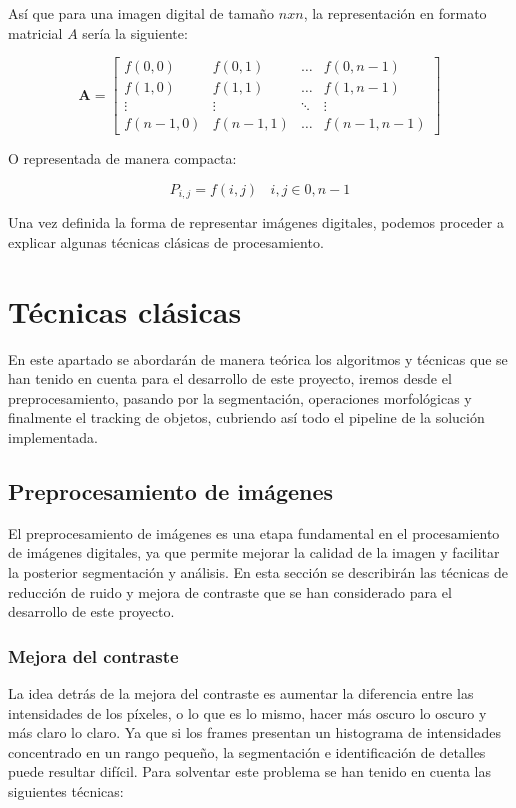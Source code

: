 Así que para una imagen digital de tamaño $n x n$, la representación en formato matricial $A$ sería la siguiente:

\begin{equation} \label{eq:matriz}
\mathbf{A} = 
\begin{bmatrix}
f(0,0) & f(0,1) & \dots & f(0,n-1) \\
f(1,0) & f(1,1) & \dots & f(1,n-1) \\
\vdots & \vdots & \ddots & \vdots \\
f(n-1,0) & f(n-1,1) & \dots & f(n-1,n-1)
\end{bmatrix}
\end{equation}

O representada de manera compacta:

\begin{equation} \label{eq:matrizCompacta}
P_{i,j} = f(i, j) ~~~~ i,j \in {0, n-1}
\end{equation}

Una vez definida la forma de representar imágenes digitales, podemos proceder a explicar algunas técnicas clásicas de procesamiento.

\section{Técnicas clásicas}

En este apartado se abordarán de manera teórica los algoritmos y técnicas que se han tenido en cuenta para el desarrollo de este proyecto, iremos desde el preprocesamiento, pasando por la segmentación, operaciones morfológicas y finalmente el tracking de objetos, cubriendo así todo el pipeline de la solución implementada.

\subsection{Preprocesamiento de imágenes}\label{subsec:preproc}

El preprocesamiento de imágenes es una etapa fundamental en el procesamiento de imágenes digitales, ya que permite mejorar la calidad de la imagen y facilitar la posterior segmentación y análisis. En esta sección se describirán las técnicas de reducción de ruido y mejora de contraste que se han considerado para el desarrollo de este proyecto.

\subsubsection{Mejora del contraste}
La idea detrás de la mejora del contraste es aumentar la diferencia entre las intensidades de los píxeles, o lo que es lo mismo, hacer más oscuro lo oscuro y más claro lo claro. Ya que si los frames presentan un histograma de intensidades concentrado en un rango pequeño, la segmentación e identificación de detalles puede resultar difícil. Para solventar este problema se han tenido en cuenta las siguientes técnicas:

